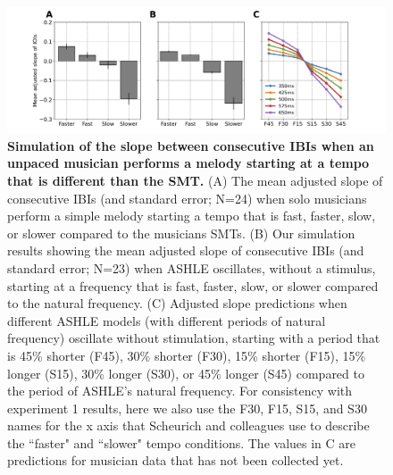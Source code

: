 \documentclass{report}
\begin{document}
\begin{figure}
    \centering
    \includegraphics[width=1.0\textwidth]{figures/fig3_3.png}
    \caption[Simulation of the slope between consecutive IBIs when an unpaced musician performs a melody starting at a tempo that is different than the SMT]{\textbf{Simulation of the slope between consecutive IBIs when an unpaced musician performs a melody starting at a tempo that is different than the SMT.} (A) The mean adjusted slope of consecutive IBIs (and standard error; N=24) when solo musicians perform a simple melody starting a tempo that is fast, faster, slow, or slower compared to the musicians SMTs. (B) Our simulation results showing the mean adjusted slope of consecutive IBIs (and standard error; N=23) when ASHLE oscillates, without a stimulus, starting at a frequency that is fast, faster, slow, or slower compared to the natural frequency. (C) Adjusted slope predictions when different ASHLE models (with different periods of natural frequency) oscillate without stimulation, starting with a period that is 45\% shorter (F45), 30\% shorter (F30), 15\% shorter (F15), 15\% longer (S15), 30\% longer (S30), or 45\% longer (S45) compared to the period of ASHLE's natural frequency. For consistency with experiment 1 results, here we also use the F30, F15, S15, and S30 names for the x axis that Scheurich and colleagues \cite{scheurich2018tapping} use to describe the ``faster" and ``slower" tempo conditions. The values in C are predictions for musician data that has not been collected yet.}
    \label{f3_3}
\end{figure}
\end{document}
